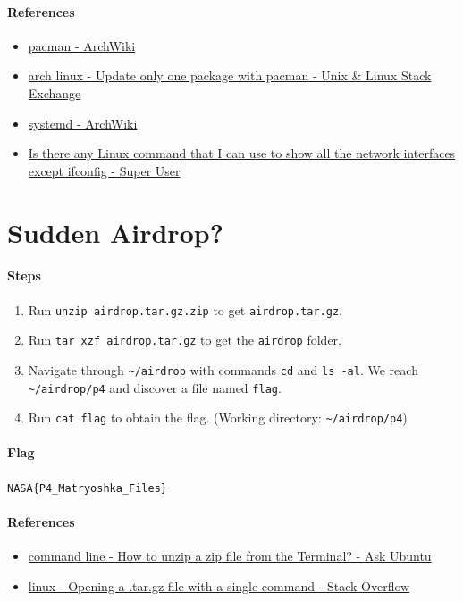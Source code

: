 \documentclass[12pt, a4paper]{article}
\begin{document}
  \paragraph{References}
  \begin{itemize}
    \item \href{https://wiki.archlinux.org/title/pacman}{pacman - ArchWiki}
    \item \href{https://unix.stackexchange.com/questions/13073/update-only-one-package-with-pacman}{arch linux - Update only one package with pacman - Unix \& Linux Stack Exchange}
    \item \href{https://wiki.archlinux.org/title/systemd}{systemd - ArchWiki}
    \item \href{https://superuser.com/questions/1229344/is-there-any-linux-command-that-i-can-use-to-show-all-the-network-interfaces-exc}{Is there any Linux command that I can use to show all the network interfaces except ifconfig - Super User}
  \end{itemize}

  \section{Sudden Airdrop?}
  \paragraph{Steps}
  \begin{enumerate}
    \item Run \verb|unzip airdrop.tar.gz.zip| to get \verb|airdrop.tar.gz|.
    \item Run \verb|tar xzf airdrop.tar.gz| to get the \verb|airdrop| folder.
    \item Navigate through \verb|~/airdrop| with commands
      \verb|cd| and \verb|ls -al|. We reach \verb|~/airdrop/p4| and discover
      a file named \verb|flag|.
    \item Run \verb|cat flag| to obtain the flag.
      (Working directory: \verb|~/airdrop/p4|)
  \end{enumerate}
  \paragraph{Flag} \verb|NASA{P4_Matryoshka_Files}|
  \paragraph{References}
  \begin{itemize}
    \item \href{https://askubuntu.com/questions/86849/how-to-unzip-a-zip-file-from-the-terminal}{command line - How to unzip a zip file from the Terminal? - Ask Ubuntu}
    \item \href{https://stackoverflow.com/questions/651018/opening-a-tar-gz-file-with-a-single-command}{linux - Opening a .tar.gz file with a single command - Stack Overflow}
  \end{itemize}
\end{document}
